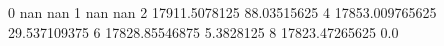 0 nan nan
1 nan nan
2 17911.5078125 88.03515625
4 17853.009765625 29.537109375
6 17828.85546875 5.3828125
8 17823.47265625 0.0
